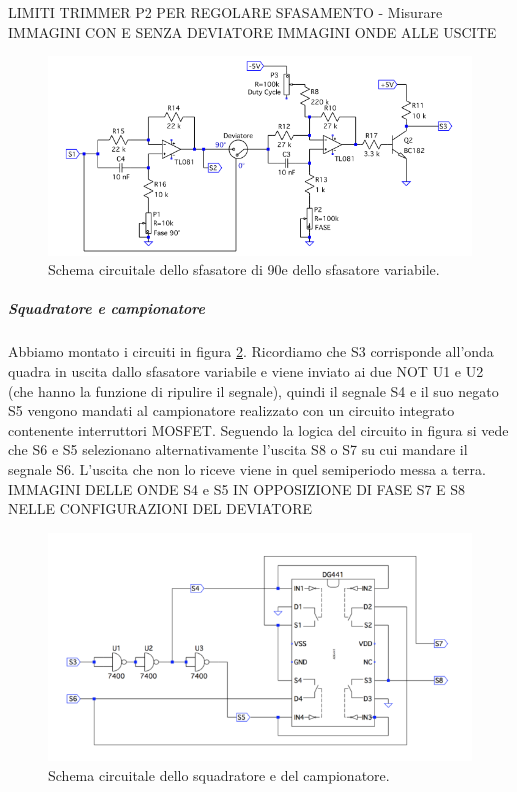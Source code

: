 \documentclass[10pt,a4paper]{article}
\begin{document}

LIMITI TRIMMER P2 PER REGOLARE SFASAMENTO - Misurare
IMMAGINI CON E SENZA DEVIATORE 
IMMAGINI ONDE ALLE USCITE

\begin{figure}[!htb]
  \centering
  \includegraphics[scale=0.75]{sfasatori.png}
\caption{Schema circuitale dello sfasatore di 90\degree e dello sfasatore variabile.\label{fig:sfasatori}}
\end{figure}


\subparagraph{Squadratore e campionatore}
Abbiamo montato i circuiti in figura \ref{fig:sqadratore-campionatore}. Ricordiamo che S3 corrisponde all'onda quadra in uscita dallo sfasatore variabile e viene inviato ai due NOT U1 e U2 (che hanno la funzione di ripulire il segnale), quindi il segnale S4 e il suo negato S5 vengono mandati al campionatore realizzato con un circuito integrato contenente interruttori MOSFET. Seguendo la logica del circuito in figura si vede che S6 e S5 selezionano alternativamente l'uscita S8 o S7 su cui mandare il segnale S6. L'uscita che non lo riceve viene in quel semiperiodo messa a terra.\\

IMMAGINI DELLE ONDE
S4 e S5 IN OPPOSIZIONE DI FASE
S7 E S8 NELLE CONFIGURAZIONI DEL DEVIATORE

\begin{figure}[!htb]
  \centering
  \includegraphics[scale=0.75]{sqadratore-campionatore.png}
\caption{Schema circuitale dello squadratore e del campionatore.\label{fig:sqadratore-campionatore}}
\end{figure}
\end{document}
